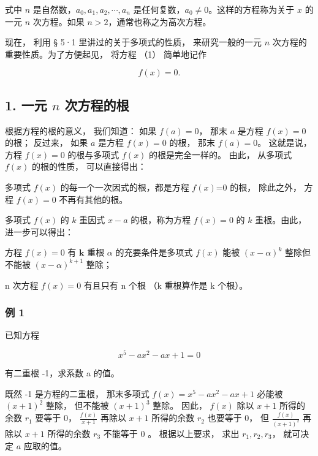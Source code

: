 式中 \(n\) 是自然数，\(a_0, a_1, a_2, \cdots, a_n\)
是任何复数，\(a_0 \neq 0\)。这样的方程称为关于 \(x\) 的一元 \(n\)
次方程。如果 \(n > 2\)，通常也称之为高次方程。

现在， 利用 § 5·1 里讲过的关于多项式的性质， 来研究一般的一元 \(n\)
次方程的重要性质。为了方便起见， 将方程 （1） 简单地记作

\[
f (x) = 0.
\]

\subsection{\texorpdfstring{1. 一元 \(n\) 次方程的根}{1. 一元 n 次方程的根}}

根据方程的根的意义， 我们知道： 如果 \(f(a) = 0\)， 那末 \(a\) 是方程
\(f(x) = 0\) 的根； 反过来， 如果 \(a\) 是方程 \(f(x) = 0\) 的根， 那末
\(f(a) = 0\)。 这就是说， 方程 \(f(x) = 0\) 的根与多项式 \(f(x)\)
的根是完全一样的。 由此， 从多项式 \(f(x)\) 的根的性质， 可以直接得出：

多项式 \(f(x)\) 的每一个一次因式的根，都是方程 \(f(x)\)=0 的根，
除此之外， 方程 \(f(x)=0\) 不再有其他的根。

多项式 \(f(x)\) 的 \(k\) 重因式 \(x - a\) 的根，称为方程 \(f(x) = 0\) 的
\(k\) 重根。由此，进一步可以得出：

方程 \(f(x) = 0\) 有 \(\pmb{k}\) 重根 \(\alpha\) 的充要条件是多项式
\(f(x)\) 能被 \((x - \alpha)^k\) 整除但不能被 \((x - \alpha)^{k + 1}\)
整除；

n 次方程 \(f(x)=0\) 有且只有 n 个根 （k 重根算作是 k 个根）。

\subsubsection{例 1}

已知方程

\[
x ^ {5} - a x ^ {2} - a x + 1 = 0
\]

有二重根 -1，求系数 a 的值。


既然 -1 是方程的二重根， 那末多项式 \(f(x) = x^5 - ax^2 - ax + 1\)
必能被 \((x + 1)^2\) 整除， 但不能被 \((x + 1)^3\) 整除。 因此，
\(f(x)\) 除以 \(x + 1\) 所得的余数 \(r_1\) 要等于 0，
\(\frac{f(x)}{x + 1}\) 再除以 \(x + 1\) 所得的余数 \(r_2\) 也要等于 0，
但 \(\frac{f(x)}{(x + 1)^2}\) 再除以 \(x + 1\) 所得的余数 \(r_3\)
不能等于 0 。 根据以上要求， 求出 \(r_1, r_2, r_3\)， 就可决定 \(a\)
应取的值。


